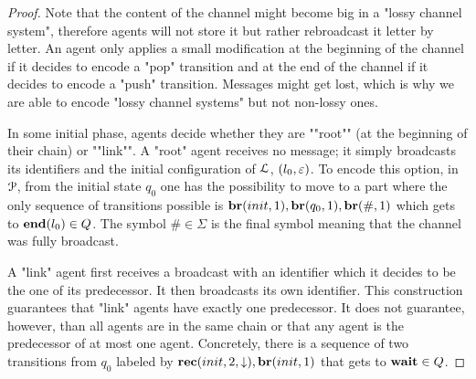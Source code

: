 \begin{proof}
	Note that the content of the channel might become big in a "lossy channel system", therefore agents will not store it but rather rebroadcast it letter by letter. An agent only applies a small modification at the beginning of the channel if it decides to encode a "pop" transition and at the end of the channel if it decides to encode a "push" transition. Messages might get lost, which is why we are able to encode "lossy channel systems" but not non-lossy ones.
	
	\AP In some initial phase, agents decide whether they are ""root"" (at the beginning of their chain) or ""link"". A "root" agent receives no message; it simply broadcasts its identifiers and the initial configuration of $\mathcal{L}$, $(l_0,\varepsilon)$. To encode this option, in $\mathcal{P}$, from the initial state $q_0$ one has the possibility to move to a part where the only sequence of transitions possible is $\br{\mathsf{init}}{1}, \br{\mathsf{q_0}}{1}, \br{\mathsf{\#}}{1}$ which gets to $\mathbf{end}(l_0) \in Q$. The symbol $\mathsf{\#} \in \Sigma$ is the final symbol meaning that the channel was fully broadcast. 
	
	A "link" agent first receives a broadcast with an identifier which it decides to be the one of its predecessor. It then broadcasts its own identifier. This construction guarantees that "link" agents have exactly one predecessor. It does not guarantee, however, than all agents are in the same chain or that any agent is the predecessor of at most one agent. Concretely, there is a sequence of two transitions from $q_0$ labeled by $\rec{\mathsf{init}}{2}{\enregact}, \br{\mathsf{init}}{1}$ that gets to $\mathbf{wait} \in Q$. 
	

\end{proof}
